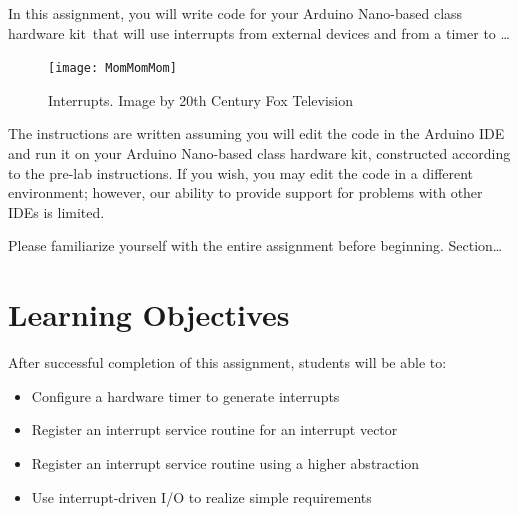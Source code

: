 

\usepackage{enumitem}
\usepackage{graphicx}
\usepackage{addfont}
\usepackage{subfig}
\usepackage{multicol}




\renewcommand{\labnumber}{9}
\renewcommand{\labname}{Using Interrupt-Driven Input/Output}
\renewcommand{\shortlabname}{interrupt-driven i/o -- interruptlab}
\renewcommand{\collaborationrules}{\individualeffort}
\renewcommand{\duedate}{Week of April 18, Before the start of your lab section}
\newcommand{\nano}{Arduino Nano}
\renewcommand{\runtimeenvironment}{your \nano-based class hardware kit}

\newcommand{\cstwo}{CSCE~156, RAIK~184H, or SOFT~161}

\startdocument

In this assignment, you will write code for \runtimeenvironment\ that will use
interrupts from external devices and from a timer to \dots

\begin{figure}[h]
    \centering
    \texttt{[image: MomMomMom]}
    \caption{Interrupts. \tiny Image by 20th Century Fox Television}
\end{figure}

The instructions are written assuming you will edit the code in the Arduino IDE
and run it on \runtimeenvironment, constructed according to the pre-lab
instructions. If you wish, you may edit the code in a different environment;
however, our ability to provide support for problems with other IDEs is limited.

Please familiarize yourself with the entire assignment before beginning.
Section\dots

\section*{Learning Objectives}

After successful completion of this assignment, students will be able to:
\begin{itemize}
\item Configure a hardware timer to generate interrupts
\item Register an interrupt service routine for an interrupt vector
\item Register an interrupt service routine using a higher abstraction
\item Use interrupt-driven I/O to realize simple requirements
\end{itemize}

